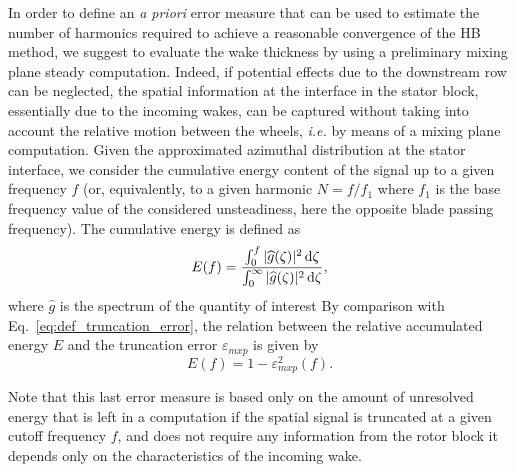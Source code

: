 In order to define an \emph{a priori} error measure 
that can be used to estimate the number of 
harmonics required to achieve a reasonable 
convergence of the HB method, we suggest to 
evaluate the wake thickness by using a preliminary 
mixing plane steady computation. Indeed, if 
potential effects due to the downstream row can 
be neglected, the spatial information at the interface 
in the stator block, essentially due to the incoming 
wakes, can be captured without taking into account 
the relative motion between the wheels, \emph{i.e.} 
by means of a mixing plane computation. 
Given the approximated azimuthal distribution at 
the stator interface, we consider the cumulative
energy content of the signal up to a given frequency $f$ 
(or, equivalently, to a given harmonic $N=f/f_1$ where $f_1$ is the
base frequency value of the considered unsteadiness,
here the opposite blade passing frequency). 
The cumulative energy is defined as
\begin{equation}
    E(f) = \frac{
      \int_0^f | \widehat{g}(\zeta)|^2 \mathop{}\!\mathrm{d} \zeta
    }{
      \int_0^\infty | \widehat{g}(\zeta)|^2 \mathop{}\!\mathrm{d} \zeta
    },
\end{equation}
where $\widehat{g}$ is the spectrum of 
the quantity of interest
By comparison with Eq.~\eqref{eq:def_truncation_error},
the relation between the relative accumulated energy $E$
and the truncation error $\varepsilon_{mxp}$ is given by
\begin{equation}
    E(f) = 1 - \varepsilon_{mxp}^2 (f).
    \label{eq:correspond_E_error}
\end{equation}


Note that this last error measure is based only on 
the amount of unresolved energy that is left 
in a computation if the spatial signal is 
truncated at a given cutoff frequency $f$, 
and does not require any information from the rotor
block it depends only on the characteristics 
of the incoming wake.

